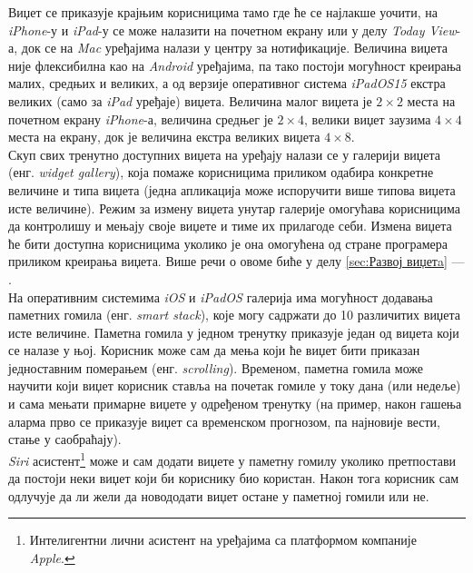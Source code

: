 \documentclass[12pt,oneside]{memoir}
\begin{document}
\indent Виџет се приказује крајњим корисницима тамо где ће се најлакше уочити, на \textit{iPhone}-у и \textit{iPad}-у се може налазити на почетном екрану или у делу \textit{Today View}-а, док се на \textit{Mac} уређајима налази у центру за нотификације. Величина виџета није флексибилна као на \textit{Android} уређајима, па тако постоји могућност креирања малих, средњих и великих, а од верзије оперативног система \textit{iPadOS15} екстра великих (само за \textit{iPad} уређаје) виџета. Величина малог виџета је $2 \times 2$ места на почетном екрану \textit{iPhone}-а, величина средњег је $2 \times 4$, велики виџет заузима $4 \times 4$ места на екрану, док је величина екстра великих виџета $4 \times 8$.
\\
\indent Скуп свих тренутно доступних виџета на уређају налази се у галерији виџета (енг. \textit{widget gallery}), која помаже корисницима приликом одабира конкретне величине и типа виџета (једна апликација може испоручити више типова виџета исте величине). Режим за измену виџета унутар галерије омогућава корисницима да контролишу и мењају своје виџете и тиме их прилагоде себи. Измена виџета ће бити доступна корисницима уколико је она омогућена од стране програмера приликом креирања виџета. Више речи о овоме биће у делу \ref{sec:Развој виџетa} --- .
\\
\indent На оперативним системима \textit{iOS} и \textit{iPadOS} галерија има могућност додавања паметних гомила (енг. \textit{smart stack}), које могу садржати до 10 различитих виџета исте величине. Паметна гомила у једном тренутку приказује један од виџета који се налазе у њој. Корисник може сам да мења који ће виџет бити приказан једноставним померањем (енг. \textit{scrolling}). Временом, паметна гомила може научити који виџет корисник ставља на почетак гомиле у току дана (или недеље) и сама мењати примарне виџете у одређеном тренутку (на пример, након гашења аларма прво се приказује виџет са временском прогнозом, па најновије вести, стање у саобраћају).
\\
\indent \textit{Siri} асистент\footnote{Интелигентни лични асистент на уређајима са платформом компаније \textit{Apple}.} може и сам додати виџете у паметну гомилу уколико претпостави да постоји неки виџет који би кориснику био користан. Након тога корисник сам одлучује да ли жели да новододати виџет остане у паметној гомили или не.
\end{document}
